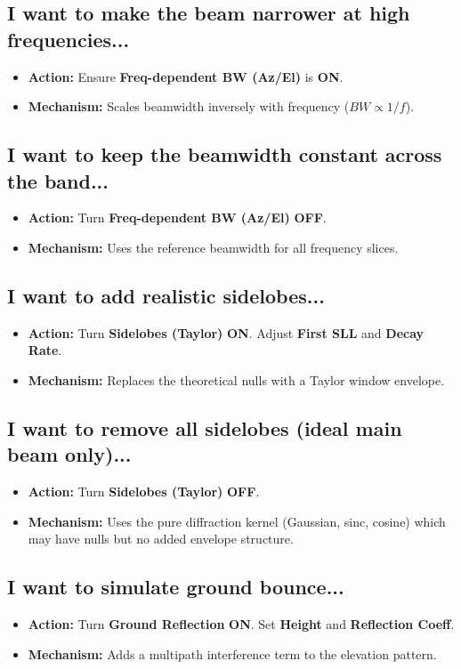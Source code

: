 \documentclass[11pt,a4paper]{article}
\begin{document}
\subsection{I want to make the beam narrower at high frequencies...}
\begin{itemize}
    \item \textbf{Action:} Ensure \textbf{Freq-dependent BW (Az/El)} is \textbf{ON}.
    \item \textbf{Mechanism:} Scales beamwidth inversely with frequency ($BW \propto 1/f$).
\end{itemize}

\subsection{I want to keep the beamwidth constant across the band...}
\begin{itemize}
    \item \textbf{Action:} Turn \textbf{Freq-dependent BW (Az/El)} \textbf{OFF}.
    \item \textbf{Mechanism:} Uses the reference beamwidth for all frequency slices.
\end{itemize}

\subsection{I want to add realistic sidelobes...}
\begin{itemize}
    \item \textbf{Action:} Turn \textbf{Sidelobes (Taylor)} \textbf{ON}. Adjust \textbf{First SLL} and \textbf{Decay Rate}.
    \item \textbf{Mechanism:} Replaces the theoretical nulls with a Taylor window envelope.
\end{itemize}

\subsection{I want to remove all sidelobes (ideal main beam only)...}
\begin{itemize}
    \item \textbf{Action:} Turn \textbf{Sidelobes (Taylor)} \textbf{OFF}.
    \item \textbf{Mechanism:} Uses the pure diffraction kernel (Gaussian, sinc, cosine) which may have nulls but no added envelope structure.
\end{itemize}

\subsection{I want to simulate ground bounce...}
\begin{itemize}
    \item \textbf{Action:} Turn \textbf{Ground Reflection} \textbf{ON}. Set \textbf{Height} and \textbf{Reflection Coeff}.
    \item \textbf{Mechanism:} Adds a multipath interference term to the elevation pattern.
\end{itemize}
\end{document}
